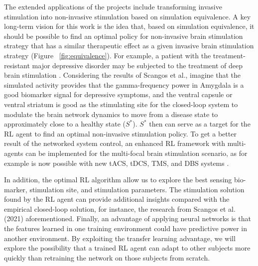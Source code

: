 \documentclass[12pt, a4paper]{article}
\begin{document}
The extended applications of the projects include transforming invasive stimulation into non-invasive stimulation based on simulation equivalence.
A key long-term vision for this work is the idea that, based on simulation equivalence, it should be possible to find an optimal policy for non-invasive brain stimulation strategy that has a similar therapeutic effect as a given invasive brain stimulation strategy (Figure ~\ref{fig:equivalence}). For example, a patient with the treatment-resistant major depressive disorder may be subjected to the treatment of deep brain stimulation \parencite{scangosClosedloopNeuromodulationIndividual2021}. Considering the results of Scangos et al., imagine that the simulated activity provides that the gamma-frequency power in Amygdala is a good biomarker signal for depressive symptoms, and the ventral capsule or ventral striatum is good as the stimulating site for the closed-loop system to modulate the brain network dynamics to move from a disease state to approximately close to a healthy state ($S^*$). $S^*$ then can serve as a target for the RL agent to find an optimal non-invasive stimulation policy. To get a better result of the networked system control, an enhanced RL framework with multi-agents \parencite{chuMultiagentReinforcementLearning2020} can be implemented for the multi-focal brain stimulation scenario, as for example is now possible with new tACS, tDCS, TMS, and DBS systems \parencite[e.g., ][]{jiangDynamicMultichannelTMS2013,ruffiniTargetingBrainNetworks2018,vitekSubthalamicNucleusDeep2020}.

In addition, the optimal RL algorithm allow us to explore the best sensing bio-marker, stimulation site, and stimulation parameters. The stimulation solution found by the RL agent can provide additional insights compared with the empirical closed-loop solution, for instance, the research from Scangos et al. (2021) aforementioned. Finally, an advantage of applying neural networks is that the features learned in one training environment could have predictive power in another environment. By exploiting the transfer learning advantage, we will explore the possibility that a trained RL agent can adapt to other subjects more quickly than retraining the network on those subjects from scratch.


\newpage %




\printbibliography


\end{document}
